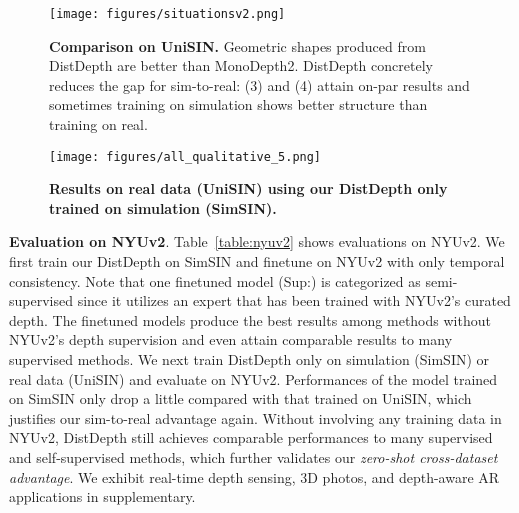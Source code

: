\documentclass[10pt,twocolumn,letterpaper]{article}
\begin{document}
\begin{figure*}[bt!]
    \centering
    \texttt{[image: figures/situationsv2.png]}
    \vspace{-4pt}
    \caption{\textbf{Comparison on UniSIN.} Geometric shapes produced from DistDepth are better than MonoDepth2. DistDepth concretely reduces the gap for sim-to-real: (3) and (4) attain on-par results and sometimes training on simulation shows better structure than training on real.}
    \vspace{-5pt}
    \label{results_comparison}
\end{figure*}

\begin{figure*}[bt!]
    \centering
    \texttt{[image: figures/all\_qualitative\_5.png]}
    \vspace{-15pt}
    \caption{\textbf{Results on real data (UniSIN) using our DistDepth only trained on simulation (SimSIN).}}
    \vspace{-5pt}
    \label{results_university}
\end{figure*}

\textbf{Evaluation on NYUv2}. Table~\ref{table:nyuv2} shows evaluations on NYUv2.
We first train our DistDepth on SimSIN and finetune on NYUv2 with only temporal consistency.
Note that one finetuned model (Sup:) is categorized as semi-supervised since it utilizes an expert that has been trained with NYUv2's curated depth. The finetuned models produce the best results among  methods without NYUv2's depth supervision and even attain comparable results to many supervised methods.
We next train DistDepth only on simulation (SimSIN) or real data (UniSIN) and evaluate on NYUv2.
Performances of the model trained on SimSIN only drop a little compared with that trained on UniSIN, which justifies our sim-to-real advantage again.
Without involving any training data in NYUv2, DistDepth still achieves comparable performances to many supervised and self-supervised methods, which further validates our \textit{zero-shot cross-dataset advantage}. 
We exhibit real-time depth sensing, 3D photos, and depth-aware AR applications in supplementary. 
\end{document}

